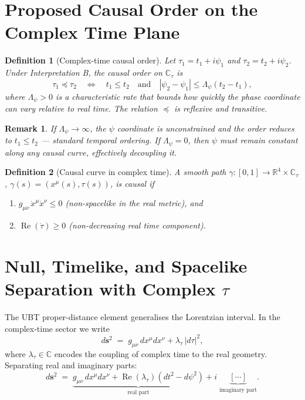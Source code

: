 \documentclass[12pt]{article}
\newtheorem{definition}{Definition}
\newtheorem{remark}{Remark}
\begin{document}
\section{Proposed Causal Order on the Complex Time Plane}
\begin{definition}[Complex-time causal order]
Let $\tau_1 = t_1 + i\psi_1$ and $\tau_2 = t_2 + i\psi_2$.  Under
Interpretation B, the \emph{causal order} on $\mathbb{C}_\tau$ is
\begin{equation}
  \tau_1 \preceq \tau_2 \quad\Longleftrightarrow\quad
  t_1 \leq t_2 \quad\text{and}\quad |\psi_2 - \psi_1| \leq \Lambda_\psi(t_2-t_1),
\end{equation}
where $\Lambda_\psi > 0$ is a characteristic rate that bounds how quickly
the phase coordinate can vary relative to real time.  The relation
$\preceq$ is reflexive and transitive.
\end{definition}

\begin{remark}
If $\Lambda_\psi \to \infty$, the $\psi$ coordinate is unconstrained and
the order reduces to $t_1 \leq t_2$ — standard temporal ordering.  If
$\Lambda_\psi = 0$, then $\psi$ must remain constant along any causal curve,
effectively decoupling it.
\end{remark}

\begin{definition}[Causal curve in complex time]
A smooth path $\gamma: [0,1] \to \mathbb{R}^4 \times \mathbb{C}_\tau$,
$\gamma(s) = (x^\mu(s), \tau(s))$, is \emph{causal} if
\begin{enumerate}
  \item $g_{\mu\nu}\,\dot{x}^\mu \dot{x}^\nu \leq 0$ (non-spacelike in the
    real metric), and
  \item $\operatorname{Re}(\dot\tau) \geq 0$ (non-decreasing real time
    component).
\end{enumerate}
\end{definition}

\section{Null, Timelike, and Spacelike Separation with Complex $\tau$}
The UBT proper-distance element generalises the Lorentzian interval.
In the complex-time sector we write
\begin{equation}
  d\mathbf{s}^2 \;=\;
  g_{\mu\nu}\,dx^\mu dx^\nu
  + \lambda_\tau\,|d\tau|^2,
\end{equation}
where $\lambda_\tau \in \mathbb{C}$ encodes the coupling of complex time to
the real geometry.  Separating real and imaginary parts:
\begin{equation}
  d\mathbf{s}^2 \;=\;
  \underbrace{g_{\mu\nu}\,dx^\mu dx^\nu
  + \operatorname{Re}(\lambda_\tau)(dt^2 - d\psi^2)}_{\text{real part}}
  + i\;\underbrace{[\cdots]}_{\text{imaginary part}}.
\end{equation}
\end{document}
